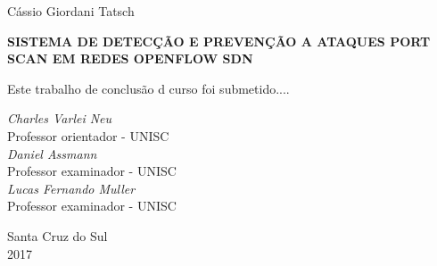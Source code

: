 \begin{folhadeaprovacao}

  \begin{center}
    Cássio Giordani Tatsch

    \vspace*{\fill}\vspace*{\fill}
    \begin{center}
        \textbf{SISTEMA DE DETECÇÃO E PREVENÇÃO A ATAQUES PORT SCAN EM REDES OPENFLOW SDN}
    \end{center}
    \vspace*{\fill}
    
    \hspace{.45\textwidth}
    \begin{minipage}{.5\textwidth}
       Este trabalho de conclusão d curso foi submetido....
    \end{minipage}%
    \vspace*{\fill}
   \end{center}

\vspace{.08\textwidth}
\textit{Charles Varlei Neu} \\ Professor orientador - UNISC \\\vspace{.05\textwidth}
\textit{Daniel Assmann} \\ Professor examinador - UNISC \\\vspace{.05\textwidth}
\textit{Lucas Fernando Muller} \\ Professor examinador - UNISC \\\vspace{.05\textwidth}
      
   \begin{center}
    Santa Cruz do Sul\\
    2017
    \vspace*{0cm}
  \end{center}
  
\end{folhadeaprovacao}